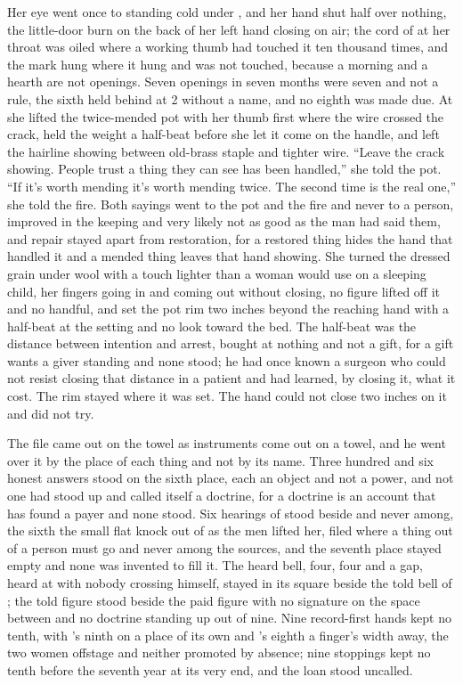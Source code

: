 Her eye went once to  standing cold under , and her hand shut half over nothing, the little-door burn on the back of her left hand closing on air; the cord of  at her throat was oiled where a working thumb had touched it ten thousand times, and the mark hung where it hung and was not touched, because a morning and a hearth are not openings. Seven openings in seven months were seven and not a rule, the sixth held behind at  2 without a name, and no eighth was made due. At  she lifted the twice-mended pot with her thumb first where the wire crossed the crack, held the weight a half-beat before she let it come on the handle, and left the hairline showing between old-brass staple and tighter wire. “Leave the crack showing. People trust a thing they can see has been handled,” she told the pot. “If it's worth mending it's worth mending twice. The second time is the real one,” she told the fire. Both sayings went to the pot and the fire and never to a person, improved in the keeping and very likely not as good as the man had said them, and repair stayed apart from restoration, for a restored thing hides the hand that handled it and a mended thing leaves that hand showing. She turned the dressed grain under wool with a touch lighter than a woman would use on a sleeping child, her fingers going in and coming out without closing, no figure lifted off it and no handful, and set the pot rim two inches beyond the reaching hand with a half-beat at the setting and no look toward the bed. The half-beat was the distance between intention and arrest, bought at nothing and not a gift, for a gift wants a giver standing and none stood; he had once known a surgeon who could not resist closing that distance in a patient and had learned, by closing it, what it cost. The rim stayed where it was set. The hand could not close two inches on it and did not try.

\scenebreak

The file came out on the towel as instruments come out on a towel, and he went over it by the place of each thing and not by its name. Three hundred and six honest answers stood on the sixth place, each an object and not a power, and not one had stood up and called itself a doctrine, for a doctrine is an account that has found a payer and none stood. Six hearings of  stood beside and never among, the sixth the small flat knock out of  as the men lifted her, filed where a thing out of a person must go and never among the sources, and the seventh place stayed empty and none was invented to fill it. The heard bell, four, four and a gap, heard at  with nobody crossing himself, stayed in its square beside the told bell of ; the told figure stood beside the paid figure with no signature on the space between and no doctrine standing up out of nine. Nine record-first hands kept no tenth, with 's ninth on a place of its own and 's eighth a finger's width away, the two women offstage and neither promoted by absence; nine stoppings kept no tenth before the seventh year at its very end, and the loan stood uncalled.


